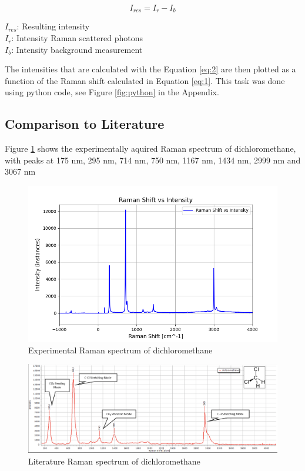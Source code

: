 \begin{equation} \label{eq:2}
    I_{res}=I_r-I_b
\end{equation}

\( I_{res}\): Resulting intensity\\
\(I_r\): Intensity Raman scattered photons\\
\(I_b\): Intensity background measurement

\bigskip

The intensities that are calculated with the Equation \ref{eq:2} are then plotted as a function of the Raman shift calculated in Equation \ref{eq:1}. This task was done using python code, see Figure \ref{fig:python} in the Appendix.

\subsection{Comparison to Literature}

Figure \ref{fig:dcm_x} shows the experimentally aquired Raman spectrum of dichloromethane, with peaks at 175 nm, 295 nm, 714 nm, 750 nm, 1167 nm, 1434 nm, 2999 nm and 3067 nm 
\begin{figure}[h]
    \centering
    \includegraphics[width=\textwidth]{images/raman_spectra/raman_shift_DCM.png}
    \caption{Experimental Raman spectrum of dichloromethane}
    \label{fig:dcm_x}
\end{figure}

\begin{figure}[h]
    \includegraphics[width=\textwidth]{images/lit_raman/dichloromethane.png}
    \caption{Literature Raman spectrum of dichloromethane \cite{spectrumdcm}}
    \label{fig:dcm_l}
\end{figure}

